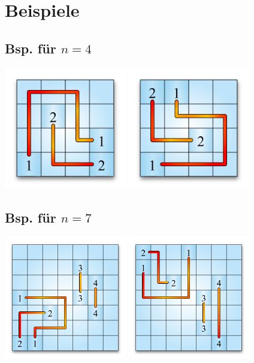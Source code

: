 \section{Beispiele}
\subsection{Bsp. für $n=4$}
\includegraphics[width=0.4\textwidth]{images/example_4_1.png}
\includegraphics[width=0.4\textwidth]{images/example_4_2.png}
\subsection{Bsp. für $n=7$}
\includegraphics[width=0.4\textwidth]{images/example_7_1.png}
\includegraphics[width=0.4\textwidth]{images/example_7_2.png}
